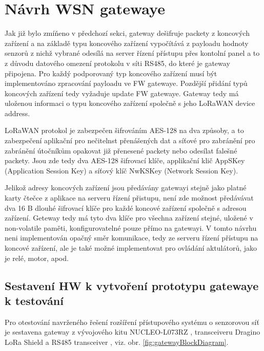 \section{Návrh WSN gatewaye}
Jak již bylo zmíňeno v předchozí sekci, gateway dešifruje packety z koncových zařízení a na základě typu koncového zařízení vypočítává z payloadu hodnoty senzorů z nichž vybrané odesílá na server řízení přístupu přes kontolní panel a to z důvodu datového omezení protokolu v síti RS485, do které je gateway připojena.
Pro každý podporovaný typ koncového zařízení musí být implementováno zpracování payloadu ve FW gatewaye. Pozdější přidání typů koncových zařízení tedy vyžaduje update FW gatewaye.
Gateway tedy má uloženou informaci o typu koncového zařízení společně s jeho LoRaWAN device address.

LoRaWAN protokol je zabezpečen šifrováním AES-128 na dva způsoby, a to zabezpečení aplikační pro nečitelnst přenášených dat a síťové pro zabránění pro zabránění útočníkům opakovat již přenesené packety nebo odesílat falešné packety. Jsou zde tedy dva AES-128 šifrovací klíče, applikační klič AppSKey (Application Session Key) a síťový klíč NwKSKey (Network Session Key).

Jelikož adresy koncových zařízení jsou předávány gatewayi stejně jako platné karty čtečce z aplikace na serveru řízení přistupu, není zde možnost předávávat dva 16 B dlouhé šifrovací klíče pro každé koncové zařízení společně s adresou zařízení. Geteway tedy má tyto dva klíče pro všechna zařízení stejné, uložené v non-volatile paměti, konfigurovatelné pouze přímo na gatewayi.
V tomto návrhu neni implementován opačný směr komunikace, tedy ze serveru řízení přístupu na koncové zařízení, ale je také možné implementovat pro ovládání aktulátorů, jako je relé, motor, apod.



\subsection{Sestavení HW k vytvoření prototypu gatewaye k testování}
Pro otestování navrženého řešení rozšíření přístupového systému o senzorovou síť je sestavena gateway z vývojového kitu NUCLEO-L073RZ \cite{nucleoST}, transceiveru Dragino LoRa Shield \cite{RFM95w} a RS485 transceiver \cite{rs485tr}, viz. obr. \ref{fig:gatewayBlockDiagram}.

